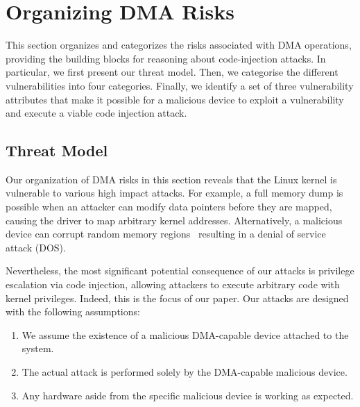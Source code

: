 
\section{Organizing DMA Risks}\label{sec:dma-risks}
This section organizes and categorizes the risks associated with DMA operations, providing the building blocks for reasoning about code-injection attacks.
In particular, we first present our threat model. Then, we categorise the different \subpage{} vulnerabilities into four categories.
Finally, we identify a set of three vulnerability attributes that make it possible for a malicious device to exploit a \subpage{} vulnerability and execute a viable code injection attack.

\subsection{Threat Model}\label{sec:threat_model}
Our organization of DMA risks in this section reveals that the Linux kernel is vulnerable to various high impact attacks.
For example, a full memory dump is possible when an attacker can modify data pointers before they are mapped, causing the driver to map arbitrary kernel addresses.
Alternatively, a malicious device can corrupt random memory regions~\cite{MMT16} resulting in a denial of service attack (DOS).


Nevertheless, the most significant potential consequence of our attacks is privilege escalation via code injection, allowing attackers to execute arbitrary code with kernel privileges. Indeed, this is the focus of our paper. 
Our attacks are designed with the following assumptions:
\begin{enumerate}
    \item We assume the existence of a malicious DMA-capable device attached to the system.
    \item The actual attack is performed solely by the DMA-capable malicious device.
    \item Any hardware aside from the specific malicious device is working as expected.
 \end{enumerate}


